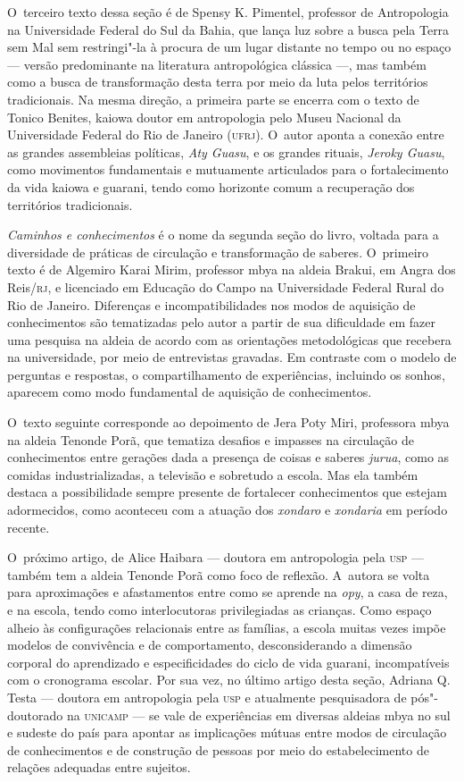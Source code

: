 O~terceiro texto dessa seção é de Spensy K. Pimentel, professor de
Antropologia na Universidade Federal do Sul da Bahia, que lança luz
sobre a busca pela Terra sem Mal sem restringi"-la à procura de um lugar
distante no tempo ou no espaço --- versão predominante na literatura
antropológica clássica ---, mas também como a busca de transformação
desta terra por meio da luta pelos territórios tradicionais. Na mesma
direção, a primeira parte se encerra com o texto de Tonico Benites,
kaiowa doutor em antropologia pelo Museu Nacional da Universidade
Federal do Rio de Janeiro (\textsc{ufrj}). O~autor aponta a conexão entre as
grandes assembleias políticas, \emph{Aty Guasu}, e os grandes rituais, \emph{Jeroky
Guasu}, como movimentos fundamentais e mutuamente articulados para o
fortalecimento da vida kaiowa e guarani, tendo como horizonte comum a
recuperação dos territórios tradicionais.

\emph{Caminhos e conhecimentos} é o nome da segunda seção do livro, voltada
para a diversidade de práticas de circulação e transformação de
saberes. O~primeiro texto é de Algemiro Karai Mirim, professor mbya na
aldeia Brakui, em Angra dos Reis/\textsc{rj}, e licenciado em
Educação do Campo na Universidade Federal Rural do Rio de Janeiro.
Diferenças e incompatibilidades nos modos de aquisição de conhecimentos
são tematizadas pelo autor a partir de sua dificuldade em fazer uma
pesquisa na aldeia de acordo com as orientações metodológicas que
recebera na universidade, por meio de entrevistas gravadas. Em
contraste com o modelo de perguntas e respostas, o compartilhamento de
experiências, incluindo os sonhos, aparecem como modo fundamental de
aquisição de conhecimentos. 

O~texto seguinte corresponde ao depoimento de Jera Poty Miri, professora
mbya na aldeia Tenonde Porã, que tematiza desafios e impasses na
circulação de conhecimentos entre gerações dada a presença de coisas e
saberes \emph{jurua}, como as comidas industrializadas, a televisão e
sobretudo a escola. Mas ela também destaca a possibilidade sempre
presente de fortalecer conhecimentos que estejam adormecidos, como
aconteceu com a atuação dos \emph{xondaro} e \emph{xondaria} em período recente. 

O~próximo artigo, de Alice Haibara --- doutora em antropologia pela \textsc{usp} ---
também tem a aldeia Tenonde Porã como foco de reflexão. A~autora se
volta para aproximações e afastamentos entre como se aprende na \emph{opy}, a
casa de reza, e na escola, tendo como interlocutoras privilegiadas as
crianças. Como espaço alheio às configurações relacionais entre as
famílias, a escola muitas vezes impõe modelos de convivência e de
comportamento, desconsiderando a dimensão corporal do aprendizado e
especificidades do ciclo de vida guarani, incompatíveis com o
cronograma escolar. Por sua vez, no último artigo desta seção, Adriana
Q. Testa --- doutora em antropologia pela \textsc{usp} e atualmente pesquisadora
de pós"-doutorado na \textsc{unicamp} --- se vale de experiências em diversas
aldeias mbya no sul e sudeste do país para apontar as implicações
mútuas entre modos de circulação de conhecimentos e de construção de
pessoas por meio do estabelecimento de relações adequadas entre
sujeitos. 

